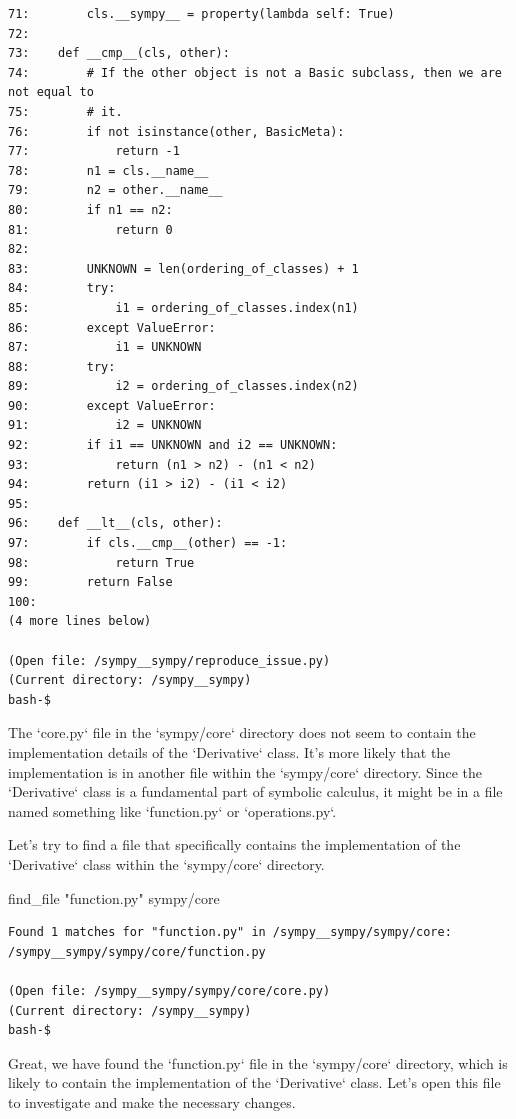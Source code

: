 {\begin{observationbox}
\begin{Verbatim}[breaklines=true, breakanywhere=true]
71:        cls.__sympy__ = property(lambda self: True)
72:
73:    def __cmp__(cls, other):
74:        # If the other object is not a Basic subclass, then we are not equal to
75:        # it.
76:        if not isinstance(other, BasicMeta):
77:            return -1
78:        n1 = cls.__name__
79:        n2 = other.__name__
80:        if n1 == n2:
81:            return 0
82:
83:        UNKNOWN = len(ordering_of_classes) + 1
84:        try:
85:            i1 = ordering_of_classes.index(n1)
86:        except ValueError:
87:            i1 = UNKNOWN
88:        try:
89:            i2 = ordering_of_classes.index(n2)
90:        except ValueError:
91:            i2 = UNKNOWN
92:        if i1 == UNKNOWN and i2 == UNKNOWN:
93:            return (n1 > n2) - (n1 < n2)
94:        return (i1 > i2) - (i1 < i2)
95:
96:    def __lt__(cls, other):
97:        if cls.__cmp__(other) == -1:
98:            return True
99:        return False
100:
(4 more lines below)

(Open file: /sympy__sympy/reproduce_issue.py)
(Current directory: /sympy__sympy)
bash-$
\end{Verbatim}
\end{observationbox}
\begin{agentbox}
The `core.py` file in the `sympy/core` directory does not seem to contain the implementation details of the `Derivative` class. It's more likely that the implementation is in another file within the `sympy/core` directory. Since the `Derivative` class is a fundamental part of symbolic calculus, it might be in a file named something like `function.py` or `operations.py`.



Let's try to find a file that specifically contains the implementation of the `Derivative` class within the `sympy/core` directory.



\hrulefill
\begin{CodeVerbatim}[breaklines=true, breakanywhere=true]
find_file "function.py" sympy/core
\end{CodeVerbatim}
\end{agentbox}
\begin{observationbox}\begin{Verbatim}[breaklines=true, breakanywhere=true]
Found 1 matches for "function.py" in /sympy__sympy/sympy/core:
/sympy__sympy/sympy/core/function.py

(Open file: /sympy__sympy/sympy/core/core.py)
(Current directory: /sympy__sympy)
bash-$
\end{Verbatim}
\end{observationbox}
\begin{agentbox}
Great, we have found the `function.py` file in the `sympy/core` directory, which is likely to contain the implementation of the `Derivative` class. Let's open this file to investigate and make the necessary changes.




\end{agentbox}}
